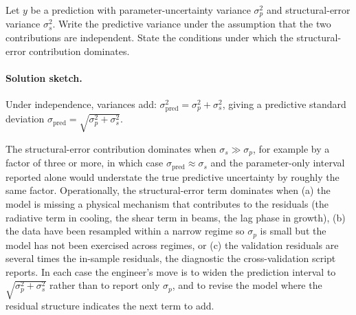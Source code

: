 \begin{exercise}
Let $y$ be a prediction with parameter-uncertainty variance
$\sigma_{p}^{2}$ and structural-error variance $\sigma_{s}^{2}$.
Write the predictive variance under the assumption that the
two contributions are independent. State the conditions under
which the structural-error contribution dominates.

\paragraph{Solution sketch.} Under independence, variances add:
$\sigma_{\text{pred}}^{2} = \sigma_{p}^{2} + \sigma_{s}^{2}$,
giving a predictive standard deviation
$\sigma_{\text{pred}} = \sqrt{\sigma_{p}^{2} + \sigma_{s}^{2}}$.

The structural-error contribution dominates when $\sigma_{s} \gg
\sigma_{p}$, for example by a factor of three or more, in which
case $\sigma_{\text{pred}} \approx \sigma_{s}$ and the
parameter-only interval reported alone would understate the true
predictive uncertainty by roughly the same factor. Operationally,
the structural-error term dominates when (a) the model is missing
a physical mechanism that contributes to the residuals (the
radiative term in cooling, the shear term in beams, the lag phase
in growth), (b) the data have been resampled within a narrow
regime so $\sigma_{p}$ is small but the model has not been
exercised across regimes, or (c) the validation residuals are
several times the in-sample residuals, the diagnostic the
cross-validation script reports. In each case the engineer's move
is to widen the prediction interval to
$\sqrt{\sigma_{p}^{2} + \sigma_{s}^{2}}$ rather than to report only
$\sigma_{p}$, and to revise the model where the residual structure
indicates the next term to add.
\end{exercise}

